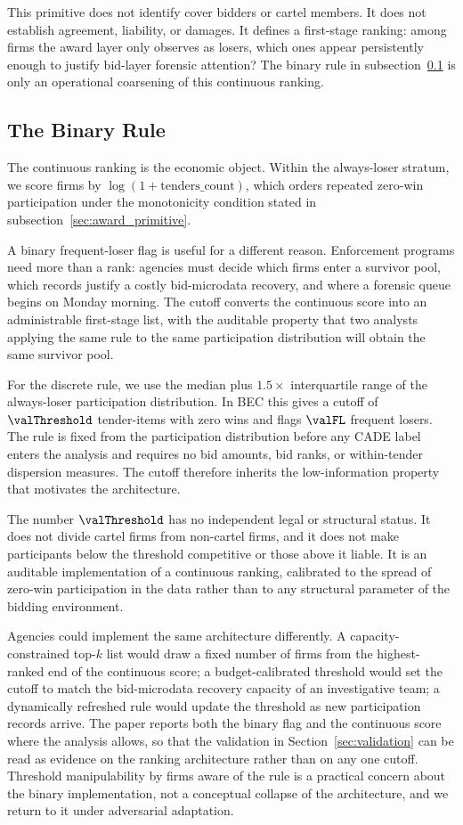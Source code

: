 This primitive does not identify cover bidders or cartel
members. It does not establish agreement, liability, or damages.
It defines a first-stage ranking: among firms the award layer
only observes as losers, which ones appear persistently enough
to justify bid-layer forensic attention? The binary rule in
subsection~\ref{sec:award_rule} is only an operational
coarsening of this continuous ranking.

\subsection{The Binary Rule}
\label{sec:award_rule}

The continuous ranking is the economic object. Within the
always-loser stratum, we score firms by
$\log(1+\text{tenders\_count})$, which orders repeated zero-win
participation under the monotonicity condition stated in
subsection~\ref{sec:award_primitive}.

A binary frequent-loser flag is useful for a different reason.
Enforcement programs need more than a rank: agencies must
decide which firms enter a survivor pool, which records justify
a costly bid-microdata recovery, and where a forensic queue
begins on Monday morning. The cutoff converts the continuous
score into an administrable first-stage list, with the
auditable property that two analysts applying the same rule to
the same participation distribution will obtain the same
survivor pool.

For the discrete rule, we use the median plus $1.5\times$
interquartile range of the always-loser participation
distribution. In BEC this gives a cutoff of $\valThreshold$
tender-items with zero wins and flags $\valFL$ frequent losers.
The rule is fixed from the participation distribution before
any CADE label enters the analysis and requires no bid amounts,
bid ranks, or within-tender dispersion measures. The cutoff
therefore inherits the low-information property that motivates
the architecture.

The number $\valThreshold$ has no independent legal or
structural status. It does not divide cartel firms from
non-cartel firms, and it does not make participants below the
threshold competitive or those above it liable. It is an
auditable implementation of a continuous ranking, calibrated to
the spread of zero-win participation in the data rather than to
any structural parameter of the bidding environment.

Agencies could implement the same architecture differently. A
capacity-constrained top-$k$ list would draw a fixed number of
firms from the highest-ranked end of the continuous score; a
budget-calibrated threshold would set the cutoff to match the
bid-microdata recovery capacity of an investigative team; a
dynamically refreshed rule would update the threshold as new
participation records arrive. The paper reports both the binary
flag and the continuous score where the analysis allows, so
that the validation in Section~\ref{sec:validation} can be read
as evidence on the ranking architecture rather than on any one
cutoff. Threshold manipulability by firms aware of the rule is
a practical concern about the binary implementation, not a
conceptual collapse of the architecture, and we return to it
under adversarial adaptation.


